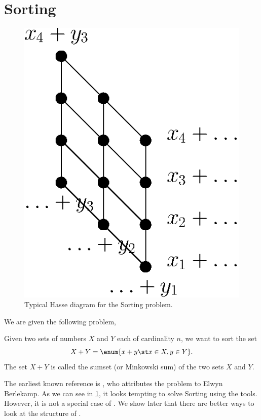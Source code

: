 \section{Sorting \XY}
\label{tree:related:xy}

\begin{figure}
	\centering
	\includegraphics[height=0.2\textheight]{fig/related/x+y}
	\caption{Typical Hasse diagram for the Sorting \XY problem.}
	\label{fig:related:xy}
\end{figure}

We are given the following problem,

\begin{problem}[Sorting \XY]
Given two sets of numbers \(X\) and \(Y\) each of cardinality \(n\), we want to
sort the set
\begin{displaymath}
X + Y = \enum{x + y \st x \in X, y \in Y}.
\end{displaymath}
The set \(X + Y\) is called the sumset (or Minkowski sum) of the two sets \(X\) and
\(Y\).
\end{problem}

The earliest known reference is \citet*{fredman:1976}, who attributes
the problem to Elwyn Berlekamp. As we can see in \ref{fig:related:xy}, it
looks tempting to solve Sorting \XY using the \concept{\SUPI} tools.
However, it is not a special case of \SUPI. We show later that
there are better ways to look at the structure of \XY.

